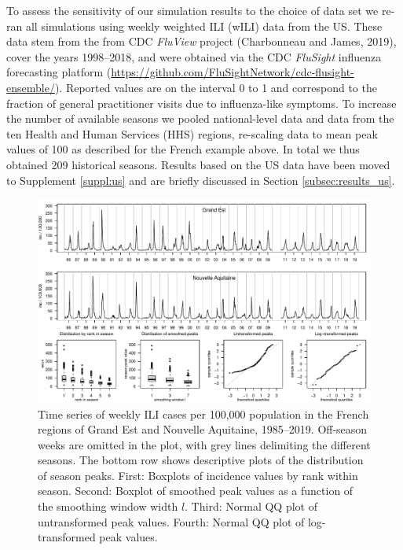 \documentclass{article}
\begin{document}
To assess the sensitivity of our simulation results to the choice of data set we re-ran all simulations using  weekly weighted ILI (wILI) data from the US. These data stem from the from CDC \textit{FluView} project (Charbonneau and James, 2019), cover the years 1998–2018, and were
obtained via the CDC \textit{FluSight} influenza forecasting platform (\url{https://github.com/FluSightNetwork/cdc-flusight-ensemble/}). Reported values are on the interval 0 to 1 and correspond to the fraction of general practitioner visits due to influenza-like symptoms. To increase the number of available seasons we pooled national-level data and data from the ten Health and Human Services (HHS) regions, re-scaling data to mean peak values of 100 as described for the French example above. In total we thus obtained 209 historical seasons. Results based on the US data have been moved to Supplement \ref{suppl:us} and are briefly discussed in Section \ref{subsec:results_us}.


\begin{figure}[h]
\center
\includegraphics[width=1\textwidth]{figure/plot_data_fr.pdf}
\caption{Time series of weekly ILI cases per 100,000 population in the French regions of Grand Est and Nouvelle Aquitaine, 1985--2019. Off-season weeks are omitted in the plot, with grey lines delimiting the different seasons. The bottom row shows descriptive plots of the distribution of season peaks. First: Boxplots of incidence values by rank within season. Second: Boxplot of smoothed peak values as a function of the smoothing window width $l$. Third: Normal QQ plot of untransformed peak values. Fourth: Normal QQ plot of log-transformed peak values.}
\label{fig:data}
\end{figure}
\end{document}
